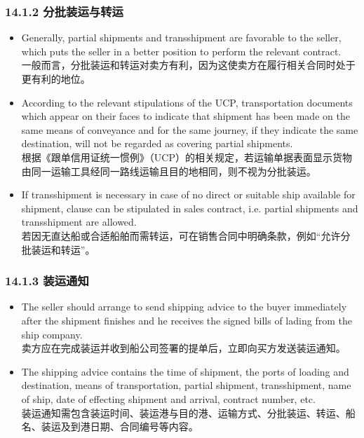 \documentclass[12pt]{beamer}
\begin{document}
    \begin{frame}[allowframebreaks]
    \frametitle{14.1.2 分批装运与转运}
    \begin{itemize}
    \item Generally, partial shipments and transshipment are favorable to the seller, which puts the seller in a better position to perform the relevant contract. \\
    一般而言，分批装运和转运对卖方有利，因为这使卖方在履行相关合同时处于更有利的地位。
    
    \item According to the relevant stipulations of the UCP, transportation documents which appear on their faces to indicate that shipment has been made on the same means of conveyance and for the same journey, if they indicate the same destination, will not be regarded as covering partial shipments. \\
    根据《跟单信用证统一惯例》（UCP）的相关规定，若运输单据表面显示货物由同一运输工具经同一路线运输且目的地相同，则不视为分批装运。
    
    \item If transshipment is necessary in case of no direct or suitable ship available for shipment, clause can be stipulated in sales contract, i.e. partial shipments and transshipment are allowed. \\
    若因无直达船或合适船舶而需转运，可在销售合同中明确条款，例如“允许分批装运和转运”。
    \end{itemize}
    \end{frame}
    
    \begin{frame}[allowframebreaks]
    \frametitle{14.1.3 装运通知}
    \begin{itemize}
    \item The seller should arrange to send shipping advice to the buyer immediately after the shipment finishes and he receives the signed bills of lading from the ship company. \\
    卖方应在完成装运并收到船公司签署的提单后，立即向买方发送装运通知。
    
    \item The shipping advice contains the time of shipment, the ports of loading and destination, means of transportation, partial shipment, transshipment, name of ship, date of effecting shipment and arrival, contract number, etc. \\
    装运通知需包含装运时间、装运港与目的港、运输方式、分批装运、转运、船名、装运及到港日期、合同编号等内容。
    \end{itemize}
    \end{frame}
    
\end{document}
